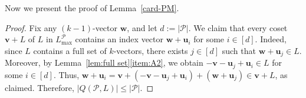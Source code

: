 \documentclass[11pt, letterpaper]{amsart}
\theoremstyle{plain}
\numberwithin{equation}{section}
\theoremstyle{definition}
\newcommand\card[1]{\left| #1 \right|}
\renewcommand{\vec}[1]{{\mathbf #1}}
\begin{document}
    


    Now we present the proof of Lemma~\ref{card-PM}.
    \begin{proof}
        Fix any \((k-1)\)-vector \(\vec{w}\), and let \(d:=\card{\mathcal{P}}\). We claim that every coset \(\vec{v}+L\) of \(L\) in \(L_{\max}^{\mathcal{P}}\) contains an index vector \(\vec{w}+\vec{u}_i\) for some \(i\in [d]\). 
        Indeed, since \(L\) contains a full set of \(k\)-vectors, there exists \(j\in [d]\) such that \(\vec{w}+\vec{u}_j\in L\). Moreover, by Lemma~\ref{lem:full set}\ref{item:A2}, we obtain \(-\vec{v}-\vec{u}_j+\vec{u}_i\in L\) for some \(i\in [d]\). 
        Thus, \(\vec{w}+\vec{u}_i=\vec{v}+(-\vec{v}-\vec{u}_j+\vec{u}_i)+(\vec{w}+\vec{u}_j)\in \vec{v}+L\), as claimed. 
        Therefore, \(\card{Q(\mathcal{P},L)}\le \card{\mathcal{P}}\).
    \end{proof}
	
\end{document}
